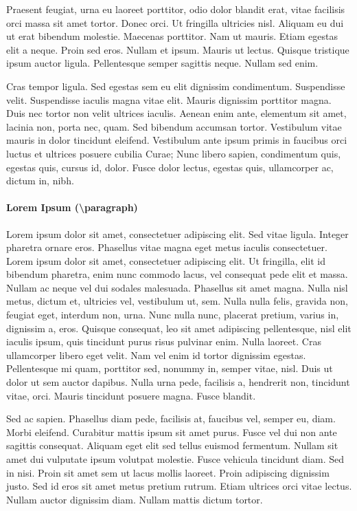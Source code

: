 \documentclass[article,colorback,accentcolor=tud4c]{tudreport}
\begin{document}
    Praesent feugiat, urna eu laoreet porttitor, odio dolor blandit erat, vitae facilisis orci massa sit amet tortor. Donec orci. Ut fringilla ultricies nisl. Aliquam eu dui ut erat bibendum molestie. Maecenas porttitor. Nam ut mauris. Etiam egestas elit a neque. Proin sed eros. Nullam et ipsum. Mauris ut lectus. Quisque tristique ipsum auctor ligula. Pellentesque semper sagittis neque. Nullam sed enim.

    Cras tempor ligula. Sed egestas sem eu elit dignissim condimentum. Suspendisse velit. Suspendisse iaculis magna vitae elit. Mauris dignissim porttitor magna. Duis nec tortor non velit ultrices iaculis. Aenean enim ante, elementum sit amet, lacinia non, porta nec, quam. Sed bibendum accumsan tortor. Vestibulum vitae mauris in dolor tincidunt eleifend. Vestibulum ante ipsum primis in faucibus orci luctus et ultrices posuere cubilia Curae; Nunc libero sapien, condimentum quis, egestas quis, cursus id, dolor. Fusce dolor lectus, egestas quis, ullamcorper ac, dictum in, nibh.

  \paragraph{Lorem Ipsum (\textbackslash paragraph)}

    Lorem ipsum dolor sit amet, consectetuer adipiscing elit. Sed vitae ligula. Integer pharetra ornare eros. Phasellus vitae magna eget metus iaculis consectetuer. Lorem ipsum dolor sit amet, consectetuer adipiscing elit. Ut fringilla, elit id bibendum pharetra, enim nunc commodo lacus, vel consequat pede elit et massa. Nullam ac neque vel dui sodales malesuada. Phasellus sit amet magna. Nulla nisl metus, dictum et, ultricies vel, vestibulum ut, sem. Nulla nulla felis, gravida non, feugiat eget, interdum non, urna. Nunc nulla nunc, placerat pretium, varius in, dignissim a, eros. Quisque consequat, leo sit amet adipiscing pellentesque, nisl elit iaculis ipsum, quis tincidunt purus risus pulvinar enim. Nulla laoreet. Cras ullamcorper libero eget velit. Nam vel enim id tortor dignissim egestas. Pellentesque mi quam, porttitor sed, nonummy in, semper vitae, nisl. Duis ut dolor ut sem auctor dapibus. Nulla urna pede, facilisis a, hendrerit non, tincidunt vitae, orci. Mauris tincidunt posuere magna. Fusce blandit.

    Sed ac sapien. Phasellus diam pede, facilisis at, faucibus vel, semper eu, diam. Morbi eleifend. Curabitur mattis ipsum sit amet purus. Fusce vel dui non ante sagittis consequat. Aliquam eget elit sed tellus euismod fermentum. Nullam sit amet dui vulputate ipsum volutpat molestie. Fusce vehicula tincidunt diam. Sed in nisi. Proin sit amet sem ut lacus mollis laoreet. Proin adipiscing dignissim justo. Sed id eros sit amet metus pretium rutrum. Etiam ultrices orci vitae lectus. Nullam auctor dignissim diam. Nullam mattis dictum tortor.
\end{document}
